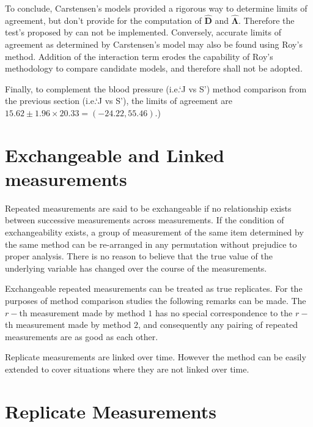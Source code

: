 \documentclass[12pt, a4paper]{report}
\theoremstyle{plain}
\theoremstyle{definition}
\theoremstyle{remark}
\begin{document}
	To conclude, Carstensen's models provided a rigorous way to determine limits of agreement, but don't provide for the computation of $\boldsymbol{\hat{D}}$ and $\boldsymbol{\hat{\Lambda}}$. Therefore the test's proposed by \citet{roy} can not be implemented. Conversely, accurate limits of agreement as determined by Carstensen's model may also be found using Roy's method. Addition of the interaction term erodes the capability of Roy's methodology to compare candidate models, and therefore shall not be adopted.
	
	Finally, to complement the blood pressure (i.e.`J vs S') method comparison from the previous section (i.e.`J vs S'), the limits of agreement are $15.62 \pm 1.96 \times 20.33 = (-24.22, 55.46)$.)
	\newpage
	
	\section{Exchangeable and Linked measurements}
	
	
	Repeated measurements are said to be exchangeable if no relationship exists between successive measurements across measurements. If the condition of exchangeability exists, a group of measurement of the same item determined by the same method can be re-arranged in any permutation without prejudice to proper analysis. There is no reason to believe that the true value of the underlying variable has changed over the course of the measurements.

	Exchangeable repeated measurements can be treated as true replicates. For the purposes of method comparison studies the following remarks can be made. The $r-$th measurement made by method $1$ has no special correspondence to the $r-$th measurement made by method $2$, and consequently any pairing of repeated measurements are as good as each other.
	
	

	
	Replicate measurements are linked over time. However the method can be easily extended to cover situations where they are not linked over time.
	
		
	
	
	\section{Replicate Measurements}
	
\end{document}
